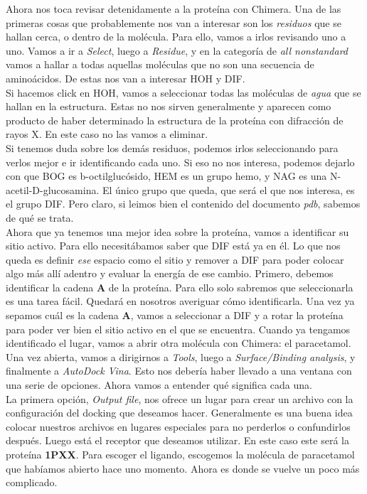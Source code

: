 \documentclass[10pt,letterpaper]{article}
\begin{document}
Ahora nos toca revisar detenidamente a la prote\'ina con Chimera. Una de las primeras cosas que probablemente nos van a interesar son los \emph{residuos} que se hallan cerca, o dentro de la mol\'ecula. Para ello, vamos a irlos revisando uno a uno. Vamos a ir a \emph{Select}, luego a \emph{Residue}, y en la categor\'ia de \emph{all nonstandard} vamos a hallar a todas aquellas mol\'eculas que no son una secuencia de amino\'acidos. De estas nos van a interesar HOH y DIF.\\

Si hacemos click en HOH, vamos a seleccionar todas las mol\'eculas de \emph{agua} que se hallan en la estructura. Estas no nos sirven generalmente y aparecen como producto de haber determinado la estructura de la prote\'ina con difracci\'on de rayos X. En este caso no las vamos a eliminar.\\

Si tenemos duda sobre los dem\'as residuos, podemos irlos seleccionando para verlos mejor e ir identificando cada uno. Si eso no nos interesa, podemos dejarlo con que BOG es b-octilgluc\'osido, HEM es un grupo hemo, y NAG es una N-acetil-D-glucosamina. El \'unico grupo que queda, que ser\'a el que nos interesa, es el grupo DIF. Pero claro, si leimos bien el contenido del documento \emph{pdb}, sabemos de qu\'e se trata.\\

Ahora que ya tenemos una mejor idea sobre la prote\'ina, vamos a identificar su sitio activo. Para ello necesit\'abamos saber que DIF est\'a ya en \'el. Lo que nos queda es definir \emph{ese} espacio como el sitio y remover a DIF para poder colocar algo m\'as all\'i adentro y evaluar la energ\'ia de ese cambio. Primero, debemos identificar la cadena \textbf{A} de la prote\'ina. Para ello solo sabremos que seleccionarla es una tarea f\'acil. Quedar\'a en nosotros averiguar c\'omo identificarla. Una vez ya sepamos cu\'al es la cadena \textbf{A}, vamos a seleccionar a DIF y a rotar la prote\'ina para poder ver bien el sitio activo en el que se encuentra. Cuando ya tengamos identificado el lugar, vamos a abrir otra mol\'ecula con Chimera: el paracetamol. Una vez abierta, vamos a dirigirnos a \emph{Tools}, luego a \emph{Surface/Binding analysis}, y finalmente a \emph{AutoDock Vina}. Esto nos deber\'ia haber llevado a una ventana con una serie de opciones. Ahora vamos a entender qu\'e significa cada una.\\

La primera opci\'on, \emph{Output file}, nos ofrece un lugar para crear un archivo con la configuraci\'on del docking que deseamos hacer. Generalmente es una buena idea colocar nuestros archivos en lugares especiales para no perderlos o confundirlos despu\'es. Luego est\'a el receptor que deseamos utilizar. En este caso este ser\'a la prote\'ina \textbf{1PXX}. Para escoger el ligando, escogemos la mol\'ecula de paracetamol que hab\'iamos abierto hace uno momento. Ahora es donde se vuelve un poco m\'as complicado.\\
\end{document}
